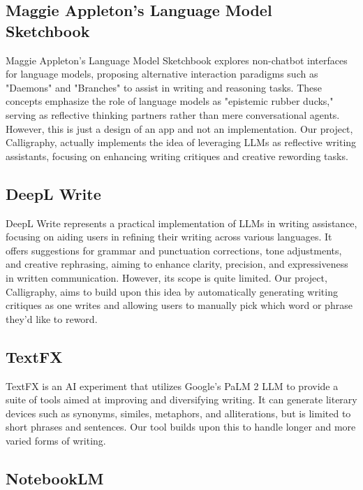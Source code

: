 \documentclass{article}
\begin{document}
\subsection{Maggie Appleton's Language Model Sketchbook}

Maggie Appleton's Language Model Sketchbook explores non-chatbot interfaces for
language models, proposing alternative interaction paradigms such as "Daemons" and
"Branches" to assist in writing and reasoning tasks. These concepts emphasize the
role of language models as "epistemic rubber ducks," serving as reflective thinking
partners rather than mere conversational agents. However, this is just a design of
an app and not an implementation. Our project, Calligraphy, actually implements
the idea of leveraging LLMs as reflective writing assistants, focusing on enhancing
writing critiques and creative rewording tasks.

\subsection{DeepL Write}

DeepL Write represents a practical implementation of LLMs in writing assistance,
focusing on aiding users in refining their writing across various languages. It
offers suggestions for grammar and punctuation corrections, tone adjustments, and
creative rephrasing, aiming to enhance clarity, precision, and expressiveness in
written communication. However, its scope is quite limited. Our project,
Calligraphy, aims to build upon this idea by automatically generating writing
critiques as one writes and allowing users to manually pick which word or phrase
they'd like to reword.

\subsection{TextFX}

TextFX is an AI experiment that utilizes Google's PaLM 2 LLM to provide a suite of
tools aimed at improving and diversifying writing. It can generate literary
devices such as synonyms, similes, metaphors, and alliterations, but is limited to
short phrases and sentences. Our tool builds upon this to handle longer and more
varied forms of writing.

\subsection{NotebookLM}
\end{document}
